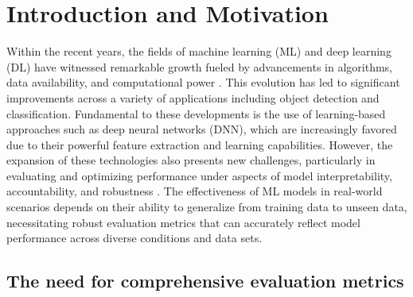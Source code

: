 \documentclass{article}
\begin{document}
\clearpage




\renewcommand{\contentsname}{Table of Contents}

\tableofcontents




\clearpage




\section{Introduction and Motivation}

Within the recent years, the fields of machine learning (ML) and deep learning (DL) have witnessed remarkable growth fueled by advancements in algorithms, data availability, and computational power \cite{sejnowski2018deep, krizhevsky2012imagenet, szegedy2015going, bronstein2017geometric, liu2021survey, zaidi2022survey}. This evolution has led to significant improvements across a variety of applications including object detection and classification. Fundamental to these developments is the use of learning-based approaches such as deep neural networks (DNN), which are increasingly favored due to their powerful feature extraction and learning capabilities. However, the expansion of these technologies also presents new challenges, particularly in evaluating and optimizing performance under aspects of model interpretability, accountability, and robustness \cite{carvalho2019machine, zhou2021evaluating, cooper2022accountability}. The effectiveness of ML models in real-world scenarios depends on their ability to generalize from training data to unseen data, necessitating robust evaluation metrics that can accurately reflect model performance across diverse conditions and data sets.


\subsection{The need for comprehensive evaluation metrics}
\end{document}
